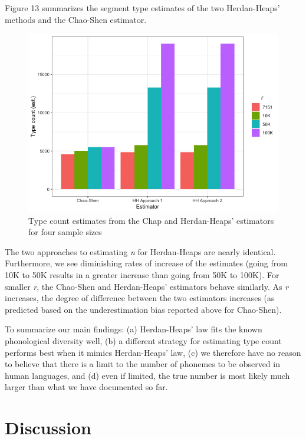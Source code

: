\documentclass[
]{article}
\begin{document}
Figure 13 summarizes the segment type estimates of the two Herdan-Heaps'
methods and the Chao-Shen estimator.

\begin{figure}

{\centering \includegraphics[width=0.8\linewidth]{README_files/figure-gfm/diff_plots_ext-1} 

}

\caption{\label{fig:diff_plot_ext}Type count estimates from the Chap and Herdan-Heaps' estimators for four sample sizes}\label{fig:diff_plot_ext}
\end{figure}

The two approaches to estimating \emph{n} for Herdan-Heaps are nearly
identical. Furthermore, we see diminishing rates of increase of the
estimates (going from 10K to 50K results in a greater increase than
going from 50K to 100K). For smaller \emph{r}, the Chao-Shen and
Herdan-Heaps' estimators behave similarly. As \emph{r} increases, the
degree of difference between the two estimators increases (as predicted
based on the underestimation bias reported above for Chao-Shen).

To summarize our main findings: (a) Herdan-Heaps' law fits the known
phonological diversity well, (b) a different strategy for estimating
type count performs best when it mimics Herdan-Heaps' law, (c) we
therefore have no reason to believe that there is a limit to the number
of phonemes to be observed in human languages, and (d) even if limited,
the true number is most likely much larger than what we have documented
so far.

\hypertarget{discussion}{%
\section{Discussion}\label{discussion}}
\end{document}

